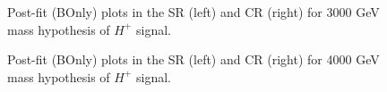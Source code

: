 \begin{figure}[H]
  \centering
  \caption{Post-fit (BOnly) plots in the SR (left) and CR (right) for 3000 GeV mass hypothesis of $H^{+}$ signal.}
  \label{fig:Postfit_Hp3000_Blind}
\end{figure}
\begin{figure}[H]
  \centering
  \caption{Post-fit (BOnly) plots in the SR (left) and CR (right) for 4000 GeV mass hypothesis of $H^{+}$ signal.}
  \label{fig:Postfit_Hp4000_Blind}
\end{figure}
